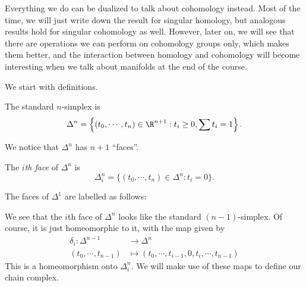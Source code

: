 \documentclass[a4paper]{article}
\theoremstyle{definition}
\begin{document}
Everything we do can be dualized to talk about cohomology instead. Most of the time, we will just write down the result for singular homology, but analogous results hold for singular cohomology as well. However, later on, we will see that there are operations we can perform on cohomology groups only, which makes them better, and the interaction between homology and cohomology will become interesting when we talk about manifolds at the end of the course.

We start with definitions.
\begin{defi}
  The standard $n$-simplex is
  \[
    \Delta^n = \left\{(t_0, \cdots, t_n) \in \R^{n + 1} : t_i \geq 0, \sum t_i = 1\right\}.
  \]
\end{defi}
\begin{center}
\end{center}
We notice that $\Delta^n$ has $n + 1$ ``faces''.
\begin{defi}
  The \emph{$i$th face} of $\Delta^n$ is
  \[
    \Delta_i^n = \{(t_0, \cdots, t_n) \in \Delta^n : t_i = 0\}.
  \]
\end{defi}
\begin{eg}
  The faces of $\Delta^1$ are labelled as follows:
  \begin{center}
  \end{center}
\end{eg}
We see that the $i$th face of $\Delta^n$ looks like the standard $(n-1)$-simplex. Of course, it is just homeomorphic to it, with the map given by
\begin{align*}
  \delta_i: \Delta^{n - 1} &\to \Delta^n\\
  (t_0, \cdots, t_{n - 1}) &\mapsto (t_0, \cdots, t_{i - 1}, 0, t_i, \cdots, t_{n - 1})
\end{align*}
This is a homeomorphism onto $\Delta_i^n$. We will make use of these maps to define our chain complex.
\end{document}

